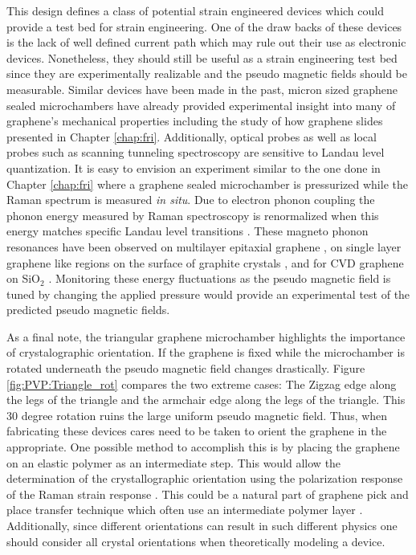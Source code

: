 This design defines a class of potential strain engineered devices which could provide a test bed for strain engineering.
One of the draw backs of these devices is the lack of well defined current path which may rule out their use as electronic devices.
Nonetheless, they should still be useful as a strain engineering test bed since they are experimentally realizable and the pseudo magnetic fields should be measurable.
Similar devices have been made in the past, micron sized graphene sealed microchambers have already provided experimental insight into many of graphene's mechanical properties including the study of how graphene slides presented in Chapter \ref{chap:fri}.
Additionally, optical probes as well as local probes such as scanning tunneling spectroscopy are sensitive to Landau level quantization.
It is easy to envision an experiment similar to the one done in Chapter \ref{chap:fri} where a graphene sealed microchamber is pressurized while the Raman spectrum is measured \emph{in situ}.
Due to electron phonon coupling the phonon energy measured by Raman spectroscopy is renormalized when this energy matches specific Landau level transitions \cite{Goerbig2011}.
These magneto phonon resonances have been observed on multilayer epitaxial graphene \cite{Faugeras2009}, on single layer graphene like regions on the surface of graphite crystals \cite{Faugeras2011}, and for CVD graphene on SiO$_2$ \cite{Kim2013}.
Monitoring these energy fluctuations as the pseudo magnetic field is tuned by changing the applied pressure would provide an experimental test of the predicted pseudo magnetic fields.

As a final note, the triangular graphene microchamber highlights the importance of crystalographic orientation.
If the graphene is fixed while the microchamber is rotated underneath the pseudo magnetic field changes drastically.
Figure \ref{fig:PVP:Triangle_rot} compares the two extreme cases: The Zigzag edge along the legs of the triangle and the armchair edge along the legs of the triangle.
This 30 degree rotation ruins the large uniform pseudo magnetic field.
Thus, when fabricating these devices cares need to be taken to orient the graphene in the appropriate.
One possible method to accomplish this is by placing the graphene on an elastic polymer as an intermediate step.
This would allow the determination of the crystallographic orientation using the polarization response of the Raman strain response \cite{Huang2009}.
This could be a natural part of graphene pick and place transfer technique which often use an intermediate polymer layer \cite{Dean2010,Zomer2011}.
Additionally, since different orientations can result in such different physics one should consider all crystal orientations when theoretically modeling a device.

